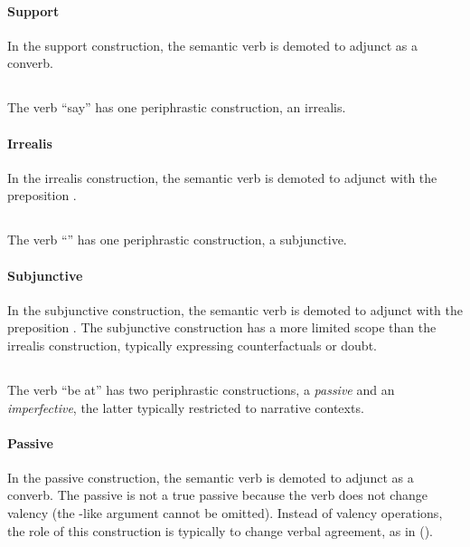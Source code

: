 \paragraph{Support}
In the support construction, the semantic verb is demoted to adjunct as a converb.

\subsection{}
The verb  “say” has one periphrastic construction, an irrealis.

\paragraph{Irrealis}
In the irrealis construction, the semantic verb is demoted to adjunct with the preposition . 

\subsection{}
The verb  “” has one periphrastic construction, a subjunctive.

\paragraph{Subjunctive}
In the subjunctive construction, the semantic verb is demoted to adjunct with the preposition . The subjunctive construction has a more limited scope than the  irrealis construction, typically expressing counterfactuals or doubt.

\subsection{}
The verb  “be at” has two periphrastic constructions, a \emph{passive} and an \emph{imperfective}, the latter typically restricted to narrative contexts.

\paragraph{Passive}
In the passive construction, the semantic verb is demoted to adjunct as a converb. The  passive is not a true passive because the verb does not change valency (\ie the -like argument cannot be omitted). Instead of valency operations, the role of this construction is typically to change verbal agreement, as in (\nextx).

